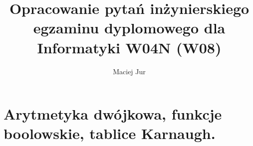 \documentclass{article}
\title{Opracowanie pytań inżynierskiego egzaminu dyplomowego dla Informatyki W04N (W08)}
\author{Maciej Jur}
\date{ }
\begin{document}
\maketitle





\section{Arytmetyka dwójkowa, funkcje boolowskie, tablice Karnaugh.}

\end{document}
